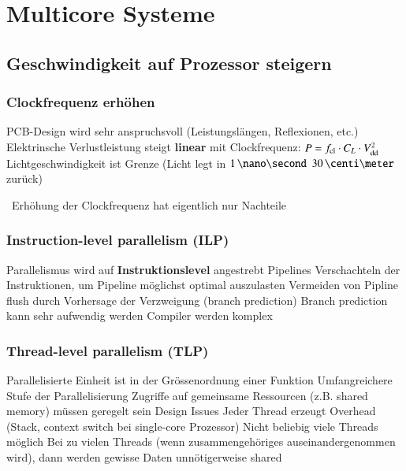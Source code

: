 \section{Multicore Systeme}

\subsection{Geschwindigkeit auf Prozessor steigern}

\subsubsection{Clockfrequenz erhöhen}

\begin{outline}
    \1 PCB-Design wird sehr anspruchsvoll (Leistungslängen, Reflexionen, etc.)
    \1 Elektrinsche Verlustleistung steigt \textbf{linear} mit Clockfrequenz: $P = f_{\rm cl} \cdot C_L \cdot V_{\rm dd}^2$
    \1 Lichtgeschwindigkeit ist Grenze (Licht legt in $1 \, \nano \second$ $30 \, \centi \meter$ zurück)
\end{outline}

\vspace{0.1cm}

\textrightarrow\ Erhöhung der Clockfrequenz hat eigentlich nur Nachteile

\columnbreak


\subsubsection{Instruction-level parallelism (ILP)}

\begin{outline}
    \1 Parallelismus wird auf \textbf{Instruktionslevel} angestrebt
        \2 Pipelines
        \2 Verschachteln der Instruktionen, um Pipeline möglichst optimal auszulasten
        \2 Vermeiden von Pipline flush durch Vorhersage der Verzweigung (branch prediction)
    \1[-] Branch prediction kann sehr aufwendig werden
    \1[-] Compiler werden komplex
\end{outline}


\subsubsection{Thread-level parallelism (TLP)}

\begin{outline}
    \1 Parallelisierte Einheit ist in der Grössenordnung einer Funktion
        \2 Umfangreichere Stufe der Parallelisierung
    \1 Zugriffe auf gemeinsame Ressourcen (z.B. shared memory) müssen geregelt sein
    \1 Design Issues
        \2 Jeder Thread erzeugt Overhead (Stack, context switch bei single-core Prozessor)
        \2 Nicht beliebig viele Threads möglich
        \2 Bei zu vielen Threads (wenn zusammengehöriges auseinandergenommen wird), dann werden
            gewisse Daten unnötigerweise shared
\end{outline}


